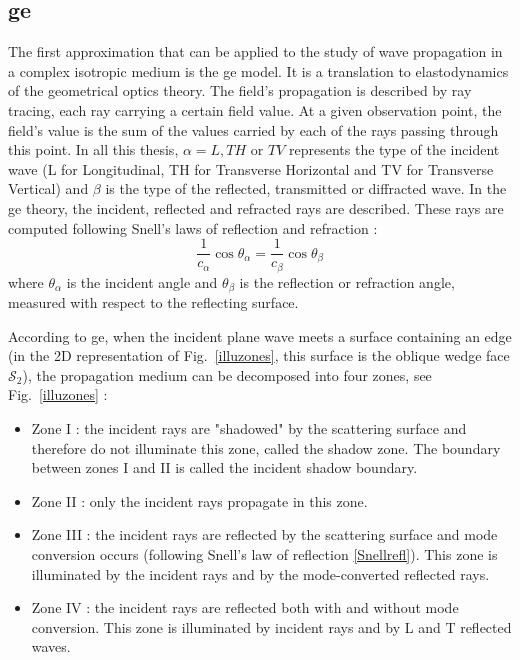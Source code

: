 \subsection{\acrfull{ge}}
\label{sectGE}
The first approximation that can be applied to the study of wave propagation in a complex isotropic medium is the \acrfull{ge} model. It is a translation to elastodynamics of the geometrical optics theory. The field's propagation is described by ray tracing, each ray carrying a certain field value. At a given observation point, the field's value is the sum of the values carried by each of the rays passing through this point. In all this thesis, $\alpha=L,TH$ or $TV$ represents the type of the incident wave (L for Longitudinal, TH for Transverse Horizontal and TV for Transverse Vertical) and $\beta$ is the type of the reflected, transmitted or diffracted wave. In the \acrshort{ge} theory, the incident, reflected and refracted rays are described. These rays are computed following Snell's laws of reflection and refraction :
\begin{equation}
    \frac{1}{c_{\alpha}}\cos\theta_{\alpha} = \frac{1}{c_{\beta}} \cos\theta_{\beta}
    \label{Snellrefl}
\end{equation}
where $\theta_{\alpha}$ is the incident angle and $\theta_{\beta}$ is the reflection or refraction angle, measured with respect to the reflecting surface.

According to \acrshort{ge}, when the incident plane wave meets a surface containing an edge (in the 2D representation of Fig.~\ref{illuzones}, this surface is the oblique wedge face $\mathcal{S}_2$), the propagation medium can be decomposed into four zones, see Fig.~\ref{illuzones} :
\begin{itemize}
	\item Zone I : the incident rays are "shadowed" by the scattering surface and therefore do not illuminate this zone, called the shadow zone. The boundary between zones I and II is called the incident shadow boundary.
    \item Zone II : only the incident rays propagate in this zone.
    \item Zone III :  the incident rays are reflected by the scattering surface and mode conversion occurs (following Snell's law of reflection \eqref{Snellrefl}). This zone is illuminated by the incident rays and by the mode-converted reflected rays.
    \item Zone IV : the incident rays are reflected both with and without mode conversion. This zone is illuminated by incident rays and by L and T reflected waves.
\end{itemize}

